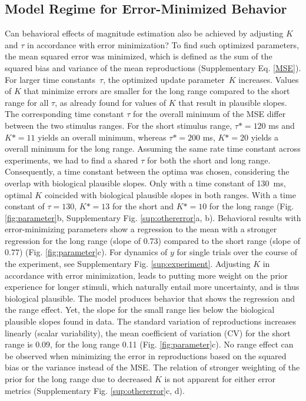 \documentclass[10pt]{article}
\begin{document}
\subsection{Model Regime for Error-Minimized Behavior} %
Can behavioral effects of magnitude estimation also be achieved by adjusting $K$ and $\tau$ in accordance with error minimization?
To find such optimized parameters, the mean squared error was minimized, which is defined as the sum of the squared bias and variance of the mean reproductions (Supplementary Eq. \ref{MSE}).
For larger time constants~$\tau$, the optimized update parameter~$K$ increases. Values of $K$ that minimize errors are smaller for the long range compared to the short range for all $\tau$, as already found for values of $K$ that result in plausible slopes.
The corresponding time constant $\tau$ for the overall minimum of the MSE differ between the two stimulus ranges. For the short stimulus range, $\tau* = 120$ ms and $K* = 11$ yields an overall minimum, whereas $\tau* = 200$ ms, $K* = 20$ yields a overall minimum for the long range. 
Assuming the same rate time constant across experiments, we had to find a shared $\tau$ for both the short and long range. Consequently, a time constant between the optima was chosen, considering the overlap with biological plausible slopes. Only with a time constant of 130~ms, optimal $K$ coincided with biological plausible slopes in both ranges. 
With a time constant of $\tau = 130$, $K* = 13$ for the short and $K* = 10$ for the long range (Fig. \ref{fig:parameter}b, Supplementary Fig. \ref{sup:othererror}a, b).
Behavioral results with error-minimizing parameters show a regression to the mean with a stronger regression for the long range (slope of 0.73) compared to the short range (slope of 0.77) (Fig. \ref{fig:parameter}c). For dynamics of $y$ for single trials over the course of the experiment, see Supplementary Fig. \ref{sup:experiment}.
Adjusting $K$ in accordance with error minimization, leads to putting more weight on the prior experience for longer stimuli, which naturally entail more uncertainty, and is thus biological plausible.
The model produces behavior that shows the regression and the range effect.
Yet, the slope for the small range lies below the biological plausible slopes found in data. 
The standard variation of reproductions increases linearly (scalar variability), the mean coefficient of variation (CV) for the short range is 0.09, for the long range 0.11 (Fig. \ref{fig:parameter}c).
No range effect can be observed when minimizing the error in reproductions based on the squared bias or the variance instead of the MSE. The relation of stronger weighting of the prior for the long range due to decreased $K$ is not apparent for either error metrics (Supplementary Fig. \ref{sup:othererror}c, d).  
\end{document}
